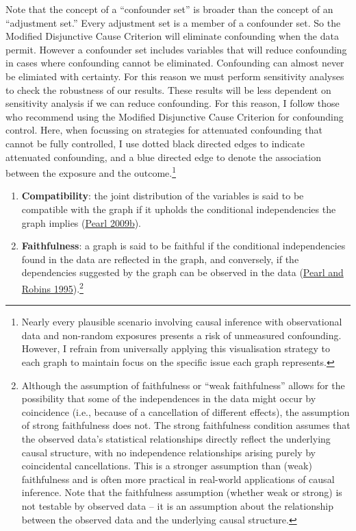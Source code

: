 \documentclass[
  singlecolumn]{article}
\begin{document}
Note that the concept of a ``confounder set'' is broader than the
concept of an ``adjustment set.'' Every adjustment set is a member of a
confounder set. So the Modified Disjunctive Cause Criterion will
eliminate confounding when the data permit. However a confounder set
includes variables that will reduce confounding in cases where
confounding cannot be eliminated. Confounding can almost never be
elimiated with certainty. For this reason we must perform sensitivity
analyses to check the robustness of our results. These results will be
less dependent on sensitivity analysis if we can reduce confounding. For
this reason, I follow those who recommend using the Modified Disjunctive
Cause Criterion for confounding control. Here, when focussing on
strategies for attenuated confounding that cannot be fully controlled, I
use dotted black directed edges to indicate attenuated confounding, and
a blue directed edge to denote the association between the exposure and
the outcome.\footnote{Nearly every plausible scenario involving causal
  inference with observational data and non-random exposures presents a
  risk of unmeasured confounding. However, I refrain from universally
  applying this visualisation strategy to each graph to maintain focus
  on the specific issue each graph represents.}

\begin{enumerate}
\def\labelenumi{\arabic{enumi}.}
\setcounter{enumi}{7}
\item
  \textbf{Compatibility}: the joint distribution of the variables is
  said to be compatible with the graph if it upholds the conditional
  independencies the graph implies
  (\protect\hyperlink{ref-pearl2009a}{Pearl 2009b}).
\item
  \textbf{Faithfulness}: a graph is said to be faithful if the
  conditional independencies found in the data are reflected in the
  graph, and conversely, if the dependencies suggested by the graph can
  be observed in the data (\protect\hyperlink{ref-pearl1995a}{Pearl and
  Robins 1995}).\footnote{Although the assumption of faithfulness or
    ``weak faithfulness'' allows for the possibility that some of the
    independences in the data might occur by coincidence (i.e., because
    of a cancellation of different effects), the assumption of strong
    faithfulness does not. The strong faithfulness condition assumes
    that the observed data's statistical relationships directly reflect
    the underlying causal structure, with no independence relationships
    arising purely by coincidental cancellations. This is a stronger
    assumption than (weak) faithfulness and is often more practical in
    real-world applications of causal inference. Note that the
    faithfulness assumption (whether weak or strong) is not testable by
    observed data -- it is an assumption about the relationship between
    the observed data and the underlying causal structure.}
\end{enumerate}
\end{document}
